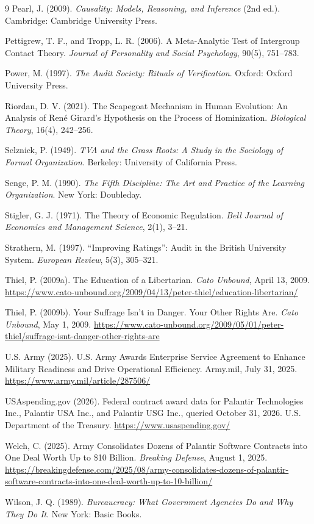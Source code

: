 \documentclass[12pt]{article}
\theoremstyle{remark}
\begin{document}
\begin{thebibliography}{9}
Pearl, J. (2009).
\emph{Causality: Models, Reasoning, and Inference} (2nd ed.).
Cambridge: Cambridge University Press.

Pettigrew, T. F., and Tropp, L. R. (2006).
A Meta-Analytic Test of Intergroup Contact Theory.
\emph{Journal of Personality and Social Psychology}, 90(5), 751--783.

Power, M. (1997).
\emph{The Audit Society: Rituals of Verification}.
Oxford: Oxford University Press.

Riordan, D. V. (2021).
The Scapegoat Mechanism in Human Evolution: An Analysis of Ren\'e Girard's Hypothesis on the Process of Hominization.
\emph{Biological Theory}, 16(4), 242--256.

Selznick, P. (1949).
\emph{TVA and the Grass Roots: A Study in the Sociology of Formal Organization}.
Berkeley: University of California Press.

Senge, P. M. (1990).
\emph{The Fifth Discipline: The Art and Practice of the Learning Organization}.
New York: Doubleday.

Stigler, G. J. (1971).
The Theory of Economic Regulation.
\emph{Bell Journal of Economics and Management Science}, 2(1), 3--21.

Strathern, M. (1997).
``Improving Ratings'': Audit in the British University System.
\emph{European Review}, 5(3), 305--321.

Thiel, P. (2009a).
The Education of a Libertarian.
\emph{Cato Unbound}, April 13, 2009.
\url{https://www.cato-unbound.org/2009/04/13/peter-thiel/education-libertarian/}

Thiel, P. (2009b).
Your Suffrage Isn't in Danger. Your Other Rights Are.
\emph{Cato Unbound}, May 1, 2009.
\url{https://www.cato-unbound.org/2009/05/01/peter-thiel/suffrage-isnt-danger-other-rights-are}

U.S. Army (2025).
U.S. Army Awards Enterprise Service Agreement to Enhance Military Readiness and Drive Operational Efficiency.
Army.mil, July 31, 2025.
\url{https://www.army.mil/article/287506/}

USAspending.gov (2026).
Federal contract award data for Palantir Technologies Inc., Palantir USA Inc., and Palantir USG Inc., queried October 31, 2026.
U.S. Department of the Treasury.
\url{https://www.usaspending.gov/}

Welch, C. (2025).
Army Consolidates Dozens of Palantir Software Contracts into One Deal Worth Up to \$10 Billion.
\emph{Breaking Defense}, August 1, 2025.
\url{https://breakingdefense.com/2025/08/army-consolidates-dozens-of-palantir-software-contracts-into-one-deal-worth-up-to-10-billion/}

Wilson, J. Q. (1989).
\emph{Bureaucracy: What Government Agencies Do and Why They Do It}.
New York: Basic Books.

\end{thebibliography}
\end{document}
